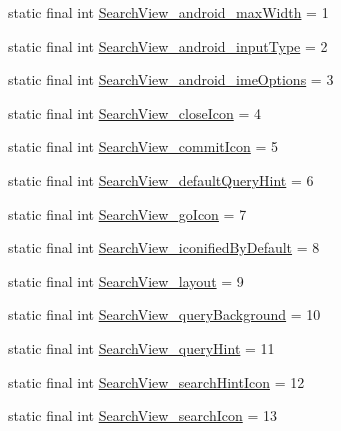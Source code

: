 \begin{DoxyCompactItemize}
\item 
static final int \mbox{\hyperlink{classandroid_1_1support_1_1design_1_1R_1_1styleable_a6ba96e60e04c3a15961ba0214a0b795b}{Search\+View\+\_\+android\+\_\+max\+Width}} = 1
\item 
static final int \mbox{\hyperlink{classandroid_1_1support_1_1design_1_1R_1_1styleable_ad64fde9d1d7d03e5623d79d10fbf61f3}{Search\+View\+\_\+android\+\_\+input\+Type}} = 2
\item 
static final int \mbox{\hyperlink{classandroid_1_1support_1_1design_1_1R_1_1styleable_a9adc851f512d660507837fbfd7465fbd}{Search\+View\+\_\+android\+\_\+ime\+Options}} = 3
\item 
static final int \mbox{\hyperlink{classandroid_1_1support_1_1design_1_1R_1_1styleable_adb39ddc97b14392a94bc635c4319f0dd}{Search\+View\+\_\+close\+Icon}} = 4
\item 
static final int \mbox{\hyperlink{classandroid_1_1support_1_1design_1_1R_1_1styleable_aa78a05d45b61ecaac65cc0990d6c8b85}{Search\+View\+\_\+commit\+Icon}} = 5
\item 
static final int \mbox{\hyperlink{classandroid_1_1support_1_1design_1_1R_1_1styleable_ae831225e4e21b799547d4dcb8591effa}{Search\+View\+\_\+default\+Query\+Hint}} = 6
\item 
static final int \mbox{\hyperlink{classandroid_1_1support_1_1design_1_1R_1_1styleable_a5b21bc9d7e1ce7c5f2b763bf5e43cec5}{Search\+View\+\_\+go\+Icon}} = 7
\item 
static final int \mbox{\hyperlink{classandroid_1_1support_1_1design_1_1R_1_1styleable_a7894d1db5faa7f5f12704b0ca93e87b5}{Search\+View\+\_\+iconified\+By\+Default}} = 8
\item 
static final int \mbox{\hyperlink{classandroid_1_1support_1_1design_1_1R_1_1styleable_a8f17d3c68b24ca5d0d8a87a645cddbb8}{Search\+View\+\_\+layout}} = 9
\item 
static final int \mbox{\hyperlink{classandroid_1_1support_1_1design_1_1R_1_1styleable_ab7e35b1ca7dacdcf1ea3b80de2fd7283}{Search\+View\+\_\+query\+Background}} = 10
\item 
static final int \mbox{\hyperlink{classandroid_1_1support_1_1design_1_1R_1_1styleable_acc4b375bea8292a63545198b51a29d5d}{Search\+View\+\_\+query\+Hint}} = 11
\item 
static final int \mbox{\hyperlink{classandroid_1_1support_1_1design_1_1R_1_1styleable_a0827f610b43401bd60d5813fe46f3fb8}{Search\+View\+\_\+search\+Hint\+Icon}} = 12
\item 
static final int \mbox{\hyperlink{classandroid_1_1support_1_1design_1_1R_1_1styleable_a497935dee330894c6113c51859a9df04}{Search\+View\+\_\+search\+Icon}} = 13

\end{DoxyCompactItemize}
